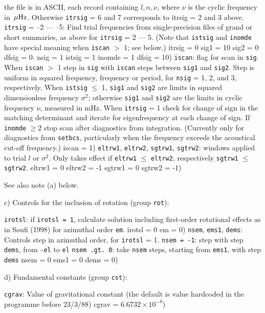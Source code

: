the file is in ASCII, each record containing $l, n, \nu$,
where $\nu$ is the cyclic frequency in $\,\mu{\rm Hz}$.
Otherwise {\tt itrsig} = 6 and 7 corresponds to itrsig = 2 and 3 above.
\pparam
{\tt itrsig} = --2 --- --5: Find trial frequencies from single-precision
files of grand or short summaries, as above for 
{\tt itrsig} = 2 --- 5.
\pparam
(Note that {\tt istsig} and {\tt inomde} have special meaning 
when {\tt iscan} $>$ 1; see below.)
{ itrsig = 0
sig1 = 10
sig2 = 0
dfsig = 0.
nsig = 1
istsig = 1
inomde = 1
dfsig = 10})
\param
{\tt iscan}: flag for scan in {\tt sig}.
When {\tt iscan} $>$ 1 step in {\tt sig} with {\tt iscan} 
steps between {\tt sig1} and {\tt sig2}.
Step is uniform in squared frequency, frequency or period, for
{\tt nsig} = 1, 2, and 3, respectively.
When {\tt istsig} $\le$ 1, {\tt sig1} and {\tt sig2}
are limits in squared dimensionless frequency $\sigma^2$;
otherwise {\tt sig1} and {\tt sig2} are the limits in
cyclic frequency $\nu$, measured in mHz.
When {\tt itrsig} = 1 check for change of sign in the matching determinant
and iterate for eigenfrequency at each change of sign.
If {\tt inomde} $\ge 2$ stop scan after diagnostics from integration.
(Currently only for diagnostics from {\tt setbcs}, particularly when 
the frequency exceeds the acoustical cut-off frequency.)
{ iscan = 1})
\param
{\tt eltrw1}, {\tt eltrw2}, {\tt sgtrw1}, {\tt sgtrw2}:
windows applied to trial $l$ or $\sigma^2$.
Only takes effect if {\tt eltrw1} $\le$ {\tt eltrw2}, 
respectively {\tt sgtrw1} $\le$ {\tt sgtrw2}.
{ eltrw1 = 0
eltrw2 = -1
sgtrw1 = 0
sgtrw2 = -1})

\noindent
See also note (a) below.

\subsect
c) Controls for the inclusion of rotation (group {\tt rot}):

\param
{\tt irotsl}: if {\tt irotsl = 1}, calculate solution including first-order
rotational effects as in Soufi {\etal} (1998) for azimuthal order {\tt em}.
{ irotsl = 0
em = 0})
\param
{\tt nsem}, {\tt ems1}, {\tt dems}: Controls step in azimuthal order, for
{\tt irotsl} = 1.
\pparam
{\tt nsem = -1}: step with step {\tt dems}, from {\tt -el} to {\tt el}
\pparam
{\tt nsem .gt. 0}: take {\tt nsem} steps, starting from {\tt ems1}, 
with step {\tt dems}
{
nsem = 0
ems1 = 0
dems = 0})

\subsect
d) Fundamental constants (group {\tt cst}):

\param
{\tt cgrav}: Value of gravitational constant (the default is value hardcoded
in the programme before 23/3/88)
{ cgrav = $6.6732\times10^{-8}$})

